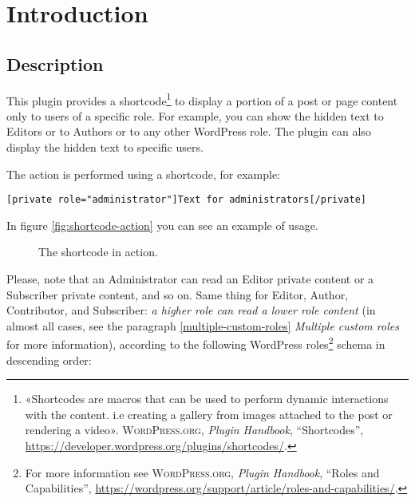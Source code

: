 \part{Introduction}

\chapter{Description}

This plugin provides a shortcode\footnote{«Shortcodes are macros that can be
used to perform dynamic interactions with the content. i.e creating a gallery
from images attached to the post or rendering a video». \textsc{WordPress.org},
\textit{Plugin Handbook}, ``Shortcodes'',
\url{https://developer.wordpress.org/plugins/shortcodes/}.} to display a portion
of a post or page content only to users of a specific role. For example, you can
show the hidden text to Editors or to Authors or to any other WordPress role.
The plugin can also display the hidden text to specific users.

The action is performed using a shortcode, for example:

\begin{lstlisting}
[private role="administrator"]Text for administrators[/private]
\end{lstlisting}

In figure \vref{fig:shortcode-action} you can see an example of usage.

\begin{figure}[h]
	\centering
	 \quad
	\caption{The shortcode in action.}
	\label{fig:shortcode-action}
\end{figure}

Please, note that an Administrator can read an Editor private content or a
Subscriber private content, and so on. Same thing for Editor, Author,
Contributor, and Subscriber: \textit{a higher role can read a lower role
content} (in almost all cases, see the paragraph \vref{multiple-custom-roles}
\textit{Multiple custom roles} for more information), according to the following
WordPress roles\footnote{For more information see \textsc{WordPress.org},
\textit{Plugin Handbook}, ``Roles and Capabilities'',
\url{https://wordpress.org/support/article/roles-and-capabilities/}.} schema in
descending order:

